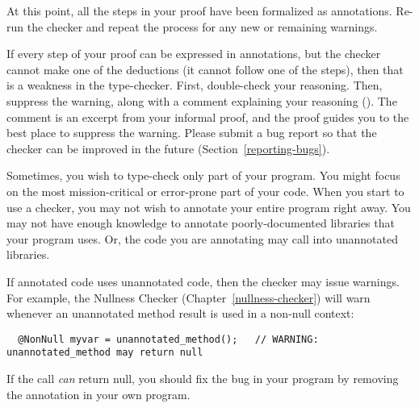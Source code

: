 At this point, all the steps in your proof have been formalized as
annotations.  Re-run the checker and repeat the process for any new or
remaining warnings.

If every step of your proof can be expressed in annotations, but the
checker cannot make one of the deductions (it cannot follow one of the
steps), then that is a weakness in the type-checker.  First, double-check
your reasoning.  Then, suppress the warning, along with a comment
explaining your reasoning ().
The comment is an excerpt from your informal proof, and the proof guides
you to the best place to suppress the warning.
Please submit a bug report so that the checker can be improved
in the future (Section~\ref{reporting-bugs}).





Sometimes, you wish to type-check only part of your program.
You might focus on the most mission-critical or error-prone part of your
code.  When you start to use a checker, you may not wish to annotate
your entire program right away.
You may not have
enough knowledge to annotate poorly-documented libraries that your program uses.
Or, the code you are annotating may call into unannotated libraries.

If annotated code uses unannotated code, then the checker may issue
warnings.  For example, the Nullness Checker (Chapter~\ref{nullness-checker}) will
warn whenever an unannotated method result is used in a non-null context:

\begin{Verbatim}
  @NonNull myvar = unannotated_method();   // WARNING: unannotated_method may return null
\end{Verbatim}

If the call \emph{can} return null, you should fix the bug in your program by
removing the  annotation in your own program.

